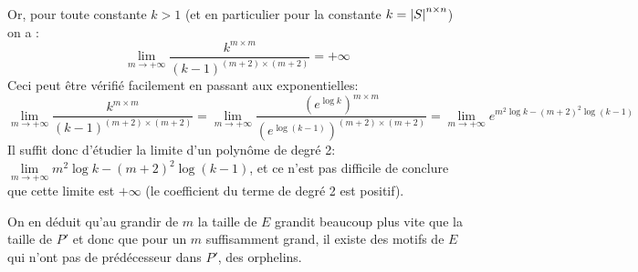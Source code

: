 \begin{proofI}
\begin{itemize}
		      Or, pour toute  constante $k > 1$ (et en particulier pour la constante $k=\left|S\right|  ^{n \times n}$) on a :
		      $$\lim\limits_{m \rightarrow +\infty} \frac{k^{m \times m }}{(k-1)^{(m + 2) \times (m + 2)}}= +\infty$$
		      Ceci peut être vérifié facilement en passant  aux exponentielles:
		      $$\lim\limits_{m \rightarrow +\infty} \frac{k^{m \times m }}{(k-1)^{(m + 2) \times (m + 2)}}=
			      \lim\limits_{m \rightarrow +\infty} \frac{(e^{\log k})^{m \times m }}{(e^{\log (k-1)})^{(m + 2) \times (m + 2)}}=
			      \lim\limits_{m \rightarrow +\infty} e^{m^2\log k - (m+2)^2\log (k-1)} $$
		      Il suffit donc d'étudier la limite d'un polynôme de degré 2:
		      $ \lim\limits_{m \rightarrow +\infty} m^2\log k - (m+2)^2\log (k-1)$,  et ce n'est pas difficile de conclure que cette
		      limite est $+\infty$ (le coefficient du terme de degré 2 est positif).


		      On en déduit qu'au grandir de $m$ la taille de $E$ grandit beaucoup plus vite que la taille de $P'$
		      et donc  que pour un $m$
		      suffisamment grand, il existe des motifs de $E$ qui n'ont pas de prédécesseur dans $P'$, \cad des orphelins.
	\end{itemize}
\end{proofI}



